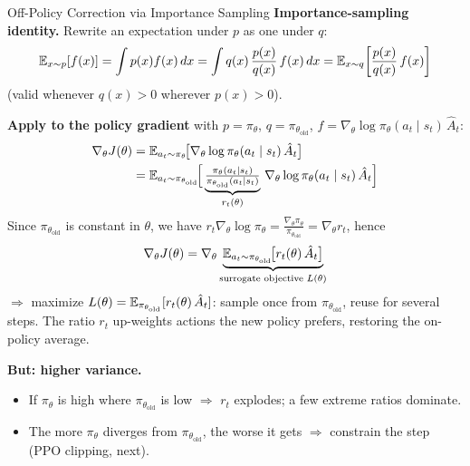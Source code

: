 \begin{frame}{Off-Policy Correction via Importance Sampling}
  \textbf{Importance-sampling identity.} Rewrite an expectation under $p$ as one under $q$:
  \[
    \mathbb{E}_{x \sim p}[f(x)] = \int p(x) f(x)\, dx = \int q(x)\, \frac{p(x)}{q(x)}\, f(x)\, dx = \mathbb{E}_{x \sim q}\!\left[\frac{p(x)}{q(x)}\, f(x)\right]
  \]
  {\footnotesize (valid whenever $q(x) > 0$ wherever $p(x) > 0$).}

  \vspace{0.3em}
  \textbf{Apply to the policy gradient} with $p = \pi_\theta$, $q = \pi_{\theta_\text{old}}$, $f = \nabla_\theta \log \pi_\theta(a_t \mid s_t)\, \hat{A}_t$:
  \begin{align*}
    \nabla_\theta J(\theta)
    &= \mathbb{E}_{a_t \sim \pi_\theta}\!\big[\nabla_\theta \log \pi_\theta(a_t \mid s_t)\, \hat{A}_t\big] \\
    &= \mathbb{E}_{a_t \sim \pi_{\theta_\text{old}}}\!\Big[\underbrace{\tfrac{\pi_\theta(a_t \mid s_t)}{\pi_{\theta_\text{old}}(a_t \mid s_t)}}_{r_t(\theta)}\, \nabla_\theta \log \pi_\theta(a_t \mid s_t)\, \hat{A}_t\Big]
  \end{align*}
  Since $\pi_{\theta_\text{old}}$ is constant in $\theta$, we have $r_t \nabla_\theta \log \pi_\theta = \tfrac{\nabla_\theta \pi_\theta}{\pi_{\theta_\text{old}}} = \nabla_\theta r_t$, hence
  \[
    \nabla_\theta J(\theta) = \nabla_\theta \underbrace{\mathbb{E}_{a_t \sim \pi_{\theta_\text{old}}}\!\big[r_t(\theta)\, \hat{A}_t\big]}_{\text{surrogate objective } L(\theta)}
  \]
  $\Rightarrow$ maximize $L(\theta) = \mathbb{E}_{\pi_{\theta_\text{old}}}[r_t(\theta)\, \hat{A}_t]$: sample once from $\pi_{\theta_\text{old}}$, reuse for several steps. The ratio $r_t$ up-weights actions the new policy prefers, restoring the on-policy average.

  \vspace{0.3em}
  \textbf{But: higher variance.}
  \begin{itemize}[nosep]
    \item If $\pi_\theta$ is high where $\pi_{\theta_\text{old}}$ is low $\Rightarrow$ $r_t$ explodes; a few extreme ratios dominate.
    \item The more $\pi_\theta$ diverges from $\pi_{\theta_\text{old}}$, the worse it gets $\Rightarrow$ constrain the step (PPO clipping, next).
  \end{itemize}
\end{frame}

